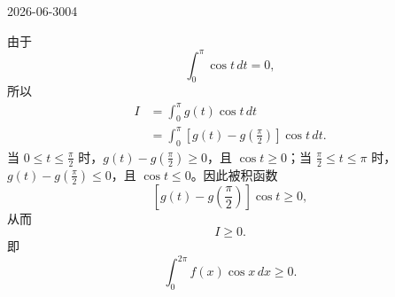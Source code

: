 \begin{mistake}{2026-06-30}{04}
\begin{solutioncontent}
由于
\[
\int_0^\pi \cos t\,dt=0,
\]
所以
\[
\begin{aligned}
I
&=\int_0^\pi g(t)\cos t\,dt \\
&=\int_0^\pi \left[g(t)-g\left(\frac\pi2\right)\right]\cos t\,dt.
\end{aligned}
\]
当 \(0\le t\le\frac\pi2\) 时，\(g(t)-g(\frac\pi2)\ge0\)，且 \(\cos t\ge0\)；当 \(\frac\pi2\le t\le\pi\) 时，\(g(t)-g(\frac\pi2)\le0\)，且 \(\cos t\le0\)。因此被积函数
\[
\left[g(t)-g\left(\frac\pi2\right)\right]\cos t\ge0,
\]
从而
\[
I\ge0.
\]
即
\[
\int_0^{2\pi} f(x)\cos x\,dx\ge 0.
\]
\end{solutioncontent}
\end{mistake}
